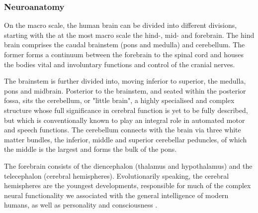 
\subsubsection{Neuroanatomy}


On the macro scale, the human brain can be divided into  different divisions, starting with the at the most macro scale the hind-, mid- and forebrain.
The hind brain comprises the caudal brainstem (pons and medulla) and cerebellum.
The former forms a continuum between the forebrain to the spinal cord and houses the bodies vital and involuntary functions and control of the cranial nerves.

The brainstem is further divided into, moving inferior to superior, the medulla, pons and midbrain.
Posterior to the brainstem, and seated within the posterior fossa, sits the cerebellum, or "little brain",
a highly specialised and complex structure whose full significance in cerebral function is yet to be fully described, but which is conventionally known to play an integral role in automated motor and speech functions.
The cerebellum connects with the brain via three white matter bundles, the inferior, middle and superior cerebellar peduncles, of which the middle is the largest and forms the bulk of the pons. 

The forebrain consists of the diencephalon (thalamus and hypothalamus) and the telecephalon (cerebral hemispheres).
Evolutionarily speaking, the cerebral hemispheres are the youngest developments, responsible for much of the complex neural functionality we associated with the general intelligence of modern humans, as well as personality and consciousness .

